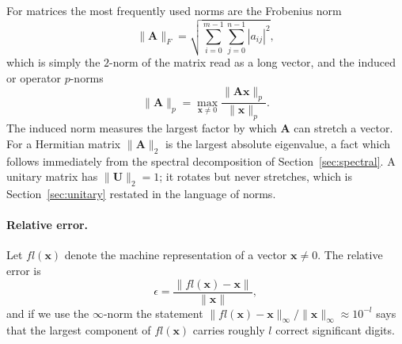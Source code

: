 For matrices the most frequently used norms are the Frobenius norm
\begin{equation}
  \|\bm{A}\|_F = \sqrt{\sum_{i=0}^{m-1}\sum_{j=0}^{n-1}|a_{ij}|^2},
  \label{eq:1-frobenius}
\end{equation}
which is simply the $2$-norm of the matrix read as a long vector, and the
induced or operator $p$-norms
\begin{equation}
  \|\bm{A}\|_p = \max_{\bm{x}\ne 0}
     \frac{\|\bm{A}\bm{x}\|_p}{\|\bm{x}\|_p} .
  \label{eq:1-opnorm}
\end{equation}
The induced norm measures the largest factor by which $\bm{A}$ can stretch a
vector.  For a Hermitian matrix $\|\bm{A}\|_2$ is the largest absolute
eigenvalue, a fact which follows immediately from the spectral decomposition
of Section~\ref{sec:spectral}.  A unitary matrix has $\|\bm{U}\|_2=1$; it
rotates but never stretches, which is Section~\ref{sec:unitary} restated in
the language of norms.

\paragraph{Relative error.}
Let $fl(\bm{x})$ denote the machine representation of a vector $\bm{x}\ne 0$.
The relative error is
\begin{equation}
  \epsilon = \frac{\|fl(\bm{x})-\bm{x}\|}{\|\bm{x}\|},
  \label{eq:1-relerr}
\end{equation}
and if we use the $\infty$-norm the statement
$\|fl(\bm{x})-\bm{x}\|_{\infty}/\|\bm{x}\|_{\infty}\approx 10^{-l}$ says that
the largest component of $fl(\bm{x})$ carries roughly $l$ correct significant
digits.

